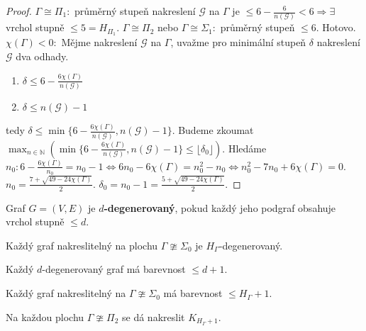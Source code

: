 \begin{proof}
	$\Gamma \cong \Pi_{1}:$ průměrný stupeň nakreslení $\mathcal{G}$ na $\Gamma$ je $\leq 6 - \frac{6}{n(\mathcal{G})} < 6 \Rightarrow \exists$ vrchol stupně $\leq 5 = H_{\Pi_{1}}$. $\Gamma \cong \Pi_{2}$ nebo $\Gamma \cong \Sigma_{1}:$ průměrný stupeň $\leq 6$. Hotovo. $\chi(\Gamma) < 0:$ Mějme nakreslení $\mathcal{G}$ na $\Gamma$, uvažme pro minimální stupeň $\delta$ nakreslení $\mathcal{G}$ dva odhady.
	
	\begin{enumerate}
		\item $\delta \leq 6 - \frac{6 \chi(\Gamma)}{n(\mathcal{G})}$
		\item $\delta \leq n(\mathcal{G}) -1$
	\end{enumerate}
	
	tedy $\delta \leq \min \{6 - \frac{6 \chi(\Gamma)}{n(\mathcal{G})}, n(\mathcal{G}) -1\}$. Budeme zkoumat $\max_{n \in \mathbb{N}}(\min \{6 - \frac{6 \chi(\Gamma)}{n(\mathcal{G})}, n(\mathcal{G}) -1\} \leq \lfloor \delta_{0} \rfloor)$. Hledáme $n_{0}: 6 - \frac{6 \chi(\Gamma)}{n_{0}} = n_{0} -1 \Leftrightarrow 6n_{0} - 6\chi(\Gamma) = n_{0}^{2} - n_{0} \Leftrightarrow n_{0}^{2} - 7n_{0} + 6\chi(\Gamma) = 0$. $n_{0} = \frac{7+\sqrt{49-24\chi(\Gamma)}}{2}$. $\delta_{0} = n_{0} - 1 = \frac{5+\sqrt{49-24\chi(\Gamma)}}{2}$.
\end{proof}

\begin{definice}
	Graf $G=(V,E)$ je \textbf{$d$-degenerovaný}, pokud každý jeho podgraf obsahuje vrchol stupně $\leq d$.
\end{definice}

\begin{dusl}
	Každý graf nakreslitelný na plochu $\Gamma \ncong \Sigma_{0}$ je $H_{\Gamma}$-degenerovaný.
\end{dusl}

\begin{pozor}
	Každý $d$-degenerovaný graf má barevnost $\leq d+1$.
\end{pozor}

\begin{dusl}[Heawood]
	Každý graf nakreslitelný na $\Gamma \ncong \Sigma_{0}$ má barevnost $\leq H_{\Gamma} + 1$.
\end{dusl}

\begin{fakt}
	Na každou plochu $\Gamma \ncong \Pi_{2}$ se dá nakreslit $K_{H_{\Gamma}+1}$.
\end{fakt}

